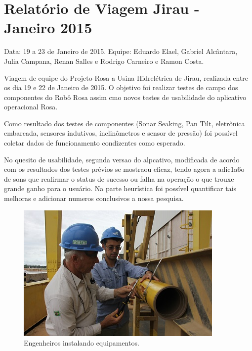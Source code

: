 \section{Relatório de Viagem Jirau - Janeiro 2015}
Data: 19 a 23 de Janeiro de 2015.
Equipe: Eduardo Elael, Gabriel Alcântara, Julia Campana, Renan Salles e Rodrigo Carneiro e Ramon Costa.

Viagem de equipe do Projeto Rosa a Usina Hidrelétrica de Jirau, realizada entre
os dia 19 e 22 de Janeiro de 2015. O objetivo foi realizar testes de campo dos
componentes do Robô Rosa assim cmo novos testes de usabilidade do aplicativo
operacional Rosa.

Como resultado dos testes de componentes (Sonar Seaking, Pan Tilt, eletrônica
embarcada, sensores indutivos, inclinômetros e sensor de pressão) foi possível
coletar dados de funcionamento condizentes como esperado.

No quesito de usabilidade, segunda versao do alpcativo, modificada de acordo com
os resultados dos testes prévios se mostraou eficaz, tendo agora a adic1a6o de
sons que reafirmar o status de sucesso ou falha na operação o que trouxe grande
ganho para o usuário. Na parte heurística foi possível quantificar tais
melhoras e adicionar numeros conclusivos a nossa pesquisa.



\begin{figure}[h!]
\centering
  \includegraphics[width=1\linewidth]{Fotos/Janeiro2015/5.jpg}
  \caption{Engenheiros instalando equipamentos.}
  \label{nov20131}
\end{figure}

